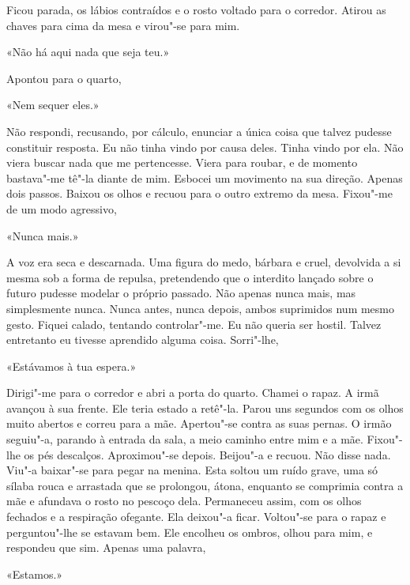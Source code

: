 Ficou parada, os lábios contraídos e o rosto voltado para o corredor.
Atirou as chaves para cima da mesa e virou"-se para mim.

«Não há aqui nada que seja teu.»

Apontou para o quarto,

«Nem sequer eles.»

Não respondi, recusando, por cálculo, enunciar a única coisa que talvez
pudesse constituir resposta. Eu não tinha vindo por causa deles. Tinha
vindo por ela. Não viera buscar nada que me pertencesse. Viera para
roubar, e de momento bastava"-me tê"-la diante de mim. Esbocei um
movimento na sua direção. Apenas dois passos. Baixou os olhos e recuou
para o outro extremo da mesa. Fixou"-me de um modo agressivo,

«Nunca mais.»

A voz era seca e descarnada. Uma figura do medo, bárbara e cruel,
devolvida a si mesma sob a forma de repulsa, pretendendo que o interdito
lançado sobre o futuro pudesse modelar o próprio passado. Não apenas
nunca mais, mas simplesmente nunca. Nunca antes, nunca depois, ambos
suprimidos num mesmo gesto. Fiquei calado, tentando controlar"-me. Eu
não queria ser hostil. Talvez entretanto eu tivesse aprendido alguma
coisa. Sorri"-lhe,

«Estávamos à tua espera.»

Dirigi"-me para o corredor e abri a porta do quarto. Chamei o rapaz. A
irmã avançou à sua frente. Ele teria estado a retê"-la. Parou uns
segundos com os olhos muito abertos e correu para a mãe. Apertou"-se
contra as suas pernas. O irmão seguiu"-a, parando à entrada da sala, a
meio caminho entre mim e a mãe. Fixou"-lhe os pés descalços.
Aproximou"-se depois. Beijou"-a e recuou. Não disse nada. Viu"-a
baixar"-se para pegar na menina. Esta soltou um ruído grave, uma só
sílaba rouca e arrastada que se prolongou, átona, enquanto se comprimia
contra a mãe e afundava o rosto no pescoço dela. Permaneceu assim, com
os olhos fechados e a respiração ofegante. Ela deixou"-a ficar.
Voltou"-se para o rapaz e perguntou"-lhe se estavam bem. Ele encolheu os
ombros, olhou para mim, e respondeu que sim. Apenas uma palavra,

«Estamos.»

